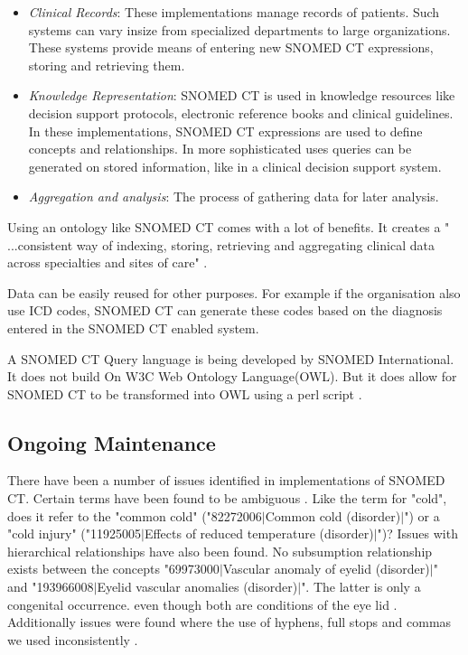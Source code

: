 \documentclass[12pt,a4paper]{article}
\begin{document}
\begin{itemize}
\item \emph{Clinical Records}: These implementations manage records of patients. Such systems can vary insize from specialized departments to large organizations. These systems provide means of entering new SNOMED CT expressions, storing and retrieving them. \citep{snomedcttech2015}

\item \emph{Knowledge Representation}: SNOMED CT is used in knowledge resources like decision support protocols, electronic reference books and clinical guidelines. In these implementations, SNOMED CT expressions are used to define concepts and relationships. In more sophisticated uses queries can be generated on stored information, like in a clinical decision support system.\citep{snomedcttech2015}

\item \emph{Aggregation and analysis}: The process of gathering data for later analysis.\citep{snomedcttech2015}
\end{itemize}

Using an ontology like SNOMED CT comes with a lot of benefits. It creates a " ...consistent way of indexing, storing, retrieving and aggregating clinical data across specialties and sites of care" \cite[p2]{y40}.

Data can be easily reused for other purposes. For example if the organisation also use ICD codes, SNOMED CT can generate these codes based on the diagnosis entered in the SNOMED CT enabled system\cite[p92]{Lee2013}.

A SNOMED CT Query language is being developed by SNOMED International. It does not build On W3C Web Ontology Language(OWL). But it does allow for SNOMED CT to be transformed into OWL using a perl script \citep[p218]{analysis}.

\subsection{Ongoing Maintenance}

There have been a number of issues identified in implementations of SNOMED CT. Certain terms have been found to be ambiguous \cite[p92]{Lee2013}. Like the term for "cold", does it refer to the "common cold" ("82272006$\mid$Common cold (disorder)$\mid$") or a "cold injury" ("11925005$\mid$Effects of reduced temperature (disorder)$\mid$")? Issues with hierarchical relationships have also been found. No subsumption relationship exists between the concepts "69973000$\mid$Vascular anomaly of eyelid (disorder)$\mid$" and "193966008$\mid$Eyelid vascular anomalies (disorder)$\mid$". The latter is only a congenital occurrence. even though both are conditions of the eye lid \cite[p92]{Lee2013}. Additionally issues were found where the use of hyphens, full stops and commas we used inconsistently \cite[p92]{Lee2013}.
\end{document}
